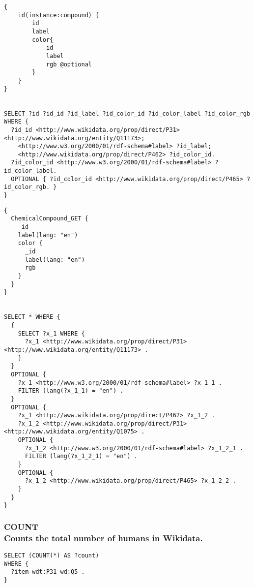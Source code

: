 \begin{minipage}{\linewidth}
\begin{lstlisting}[label=listing:listing38, caption={Query 2 - GraphQL-LD}]
{
    id(instance:compound) {
        id
        label
        color{
            id
            label
            rgb @optional
        }
    }
}


SELECT ?id ?id_id ?id_label ?id_color_id ?id_color_label ?id_color_rgb WHERE {
  ?id_id <http://www.wikidata.org/prop/direct/P31> <http://www.wikidata.org/entity/Q11173>;
    <http://www.w3.org/2000/01/rdf-schema#label> ?id_label;
    <http://www.wikidata.org/prop/direct/P462> ?id_color_id.
  ?id_color_id <http://www.w3.org/2000/01/rdf-schema#label> ?id_color_label.
  OPTIONAL { ?id_color_id <http://www.wikidata.org/prop/direct/P465> ?id_color_rgb. }      
}
\end{lstlisting}
\end{minipage}



\begin{minipage}{\linewidth}
\begin{lstlisting}[label=listing:listing39, caption={Query 2 - HyperGraphQL}]
{
  ChemicalCompound_GET {
    _id
    label(lang: "en")
    color {
      _id
      label(lang: "en")
      rgb
    }
  }
}


SELECT * WHERE { 
  { 
    SELECT ?x_1 WHERE { 
      ?x_1 <http://www.wikidata.org/prop/direct/P31> <http://www.wikidata.org/entity/Q11173> . 
    }  
  }  
  OPTIONAL { 
    ?x_1 <http://www.w3.org/2000/01/rdf-schema#label> ?x_1_1 .
    FILTER (lang(?x_1_1) = "en") .  
  }  
  OPTIONAL { 
    ?x_1 <http://www.wikidata.org/prop/direct/P462> ?x_1_2 .
    ?x_1_2 <http://www.wikidata.org/prop/direct/P31> <http://www.wikidata.org/entity/Q1075> . 
    OPTIONAL { 
      ?x_1_2 <http://www.w3.org/2000/01/rdf-schema#label> ?x_1_2_1 .
      FILTER (lang(?x_1_2_1) = "en") .  
    }  
    OPTIONAL { 
      ?x_1_2 <http://www.wikidata.org/prop/direct/P465> ?x_1_2_2 . 
    }  
  }  
}
\end{lstlisting}
\end{minipage}



\subsubsection{COUNT \\Counts the total number of humans in Wikidata.}

\begin{minipage}{\linewidth}
\begin{lstlisting}[label=listing:listing40, caption={Query 3}]
SELECT (COUNT(*) AS ?count)
WHERE {
  ?item wdt:P31 wd:Q5 .
}
\end{lstlisting}
\end{minipage}


